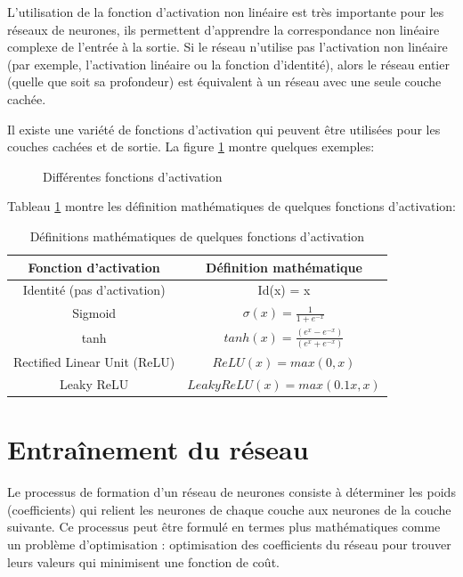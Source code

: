 L'utilisation de la fonction d'activation non linéaire est très importante pour les réseaux de neurones, ils permettent d'apprendre la correspondance non linéaire complexe de l'entrée à la sortie. Si le réseau n'utilise pas l'activation non linéaire (par exemple, l'activation linéaire ou la fonction d'identité), alors le réseau entier (quelle que soit sa profondeur) est équivalent à un réseau avec une seule couche cachée.

Il existe une variété de fonctions d'activation qui peuvent être utilisées pour les couches cachées et de sortie. La figure \ref{fig:activation-function} montre quelques exemples:

\begin{figure}[h]
    \centering
	
    \caption{Différentes fonctions d'activation}
    \label{fig:activation-function}
\end{figure}

Tableau \ref{table:activation-functions} montre les définition mathématiques de quelques fonctions d'activation:

\begin{table}[h]
    \centering
    \begin{tabular}{c|c}
        \hline
        Fonction d'activation & Définition mathématique \\
        \hline
        Identité (pas d'activation) & Id(x) = x \\
        Sigmoid & $\sigma(x)= \frac{1}{1+e^{-x}}$ \\
        tanh & $tanh(x)=\frac{(e^x-e^{-x})}{(e^x+e^{-x})}$\\
        Rectified Linear Unit (ReLU) & $ReLU(x)=max(0,x)$\\
        Leaky ReLU & $LeakyReLU(x)=max(0.1 x,x)$\\
    \hline
    \end{tabular}
    \caption{Définitions mathématiques de quelques fonctions d'activation}
    \label{table:activation-functions}
\end{table}

\section{Entraînement du réseau}
Le processus de formation d'un réseau de neurones consiste à déterminer les poids (coefficients) qui relient les neurones de chaque couche aux neurones de la couche suivante. Ce processus peut être formulé en termes plus mathématiques comme un problème d'optimisation : optimisation des coefficients du réseau pour trouver leurs valeurs qui minimisent une fonction de coût.

